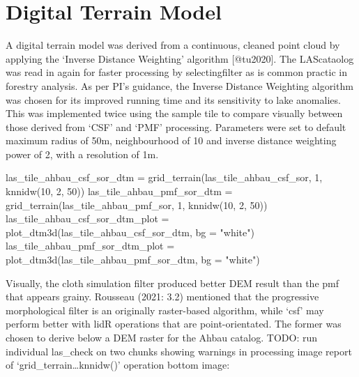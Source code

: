 \documentclass[
]{article}
\newenvironment{Shaded}{\begin{snugshade}}{\end{snugshade}}
\newcommand{\AttributeTok}[1]{\textcolor[rgb]{0.77,0.63,0.00}{#1}}
\newcommand{\DecValTok}[1]{\textcolor[rgb]{0.00,0.00,0.81}{#1}}
\newcommand{\FunctionTok}[1]{\textcolor[rgb]{0.00,0.00,0.00}{#1}}
\newcommand{\NormalTok}[1]{#1}
\newcommand{\OtherTok}[1]{\textcolor[rgb]{0.56,0.35,0.01}{#1}}
\newcommand{\StringTok}[1]{\textcolor[rgb]{0.31,0.60,0.02}{#1}}
\begin{document}
\hypertarget{digital-terrain-model}{%
\section{Digital Terrain Model}\label{digital-terrain-model}}

A digital terrain model was derived from a continuous, cleaned point
cloud by applying the `Inverse Distance Weighting' algorithm
{[}@tu2020{]}. The LAScataolog was read in again for faster processing
by selectingfilter as is common practic in forestry analysis. As per
PI's guidance, the Inverse Distance Weighting algorithm was chosen for
its improved running time and its sensitivity to lake anomalies. This
was implemented twice using the sample tile to compare visually between
those derived from `CSF' and `PMF' processing. Parameters were set to
default maximum radius of 50m, neighbourhood of 10 and inverse distance
weighting power of 2, with a resolution of 1m.

\begin{Shaded}
\begin{Highlighting}[]
\NormalTok{las\_tile\_ahbau\_csf\_sor\_dtm }\OtherTok{=} \FunctionTok{grid\_terrain}\NormalTok{(las\_tile\_ahbau\_csf\_sor, }\DecValTok{1}\NormalTok{, }\FunctionTok{knnidw}\NormalTok{(}\DecValTok{10}\NormalTok{, }\DecValTok{2}\NormalTok{, }\DecValTok{50}\NormalTok{))}
\NormalTok{las\_tile\_ahbau\_pmf\_sor\_dtm }\OtherTok{=} \FunctionTok{grid\_terrain}\NormalTok{(las\_tile\_ahbau\_pmf\_sor, }\DecValTok{1}\NormalTok{, }\FunctionTok{knnidw}\NormalTok{(}\DecValTok{10}\NormalTok{, }\DecValTok{2}\NormalTok{, }\DecValTok{50}\NormalTok{))}
\NormalTok{las\_tile\_ahbau\_csf\_sor\_dtm\_plot }\OtherTok{=} \FunctionTok{plot\_dtm3d}\NormalTok{(las\_tile\_ahbau\_csf\_sor\_dtm, }\AttributeTok{bg =} \StringTok{"white"}\NormalTok{) }
\NormalTok{las\_tile\_ahbau\_pmf\_sor\_dtm\_plot }\OtherTok{=} \FunctionTok{plot\_dtm3d}\NormalTok{(las\_tile\_ahbau\_pmf\_sor\_dtm, }\AttributeTok{bg =} \StringTok{"white"}\NormalTok{) }
\end{Highlighting}
\end{Shaded}

Visually, the cloth simulation filter produced better DEM result than
the pmf that appears grainy. Rousseau (2021: 3.2) mentioned that the
progressive morphological filter is an originally raster-based
algorithm, while `csf' may perform better with lidR operations that are
point-orientated. The former was chosen to derive below a DEM raster for
the Ahbau catalog. TODO: run individual las\_check on two chunks showing
warnings in processing image report of `grid\_terrain\ldots knnidw()'
operation bottom image:
\end{document}
